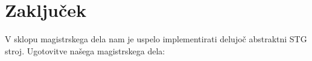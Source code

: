 %

\chapter{Zaključek}
\label{ch:zakljucek}

V sklopu magistrskega dela nam je uspelo implementirati delujoč abstraktni STG stroj. Ugotovitve našega magistrskega dela: 

